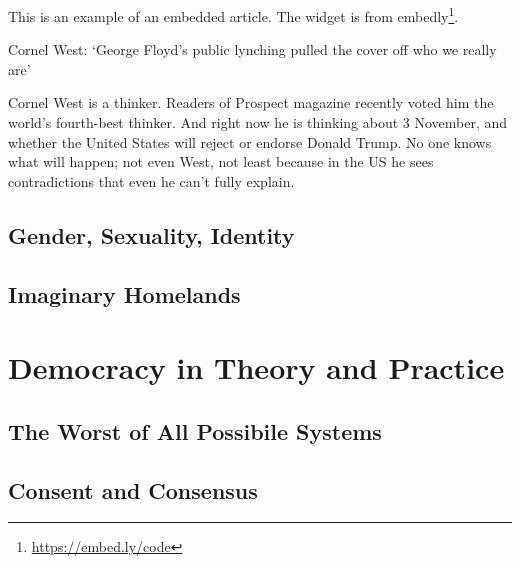 \documentclass[
  12pt, openany]{book}
\renewcommand{\href}[2]{#2\footnote{\url{#1}}}
\newenvironment{embed}{\begin{center}}{\end{center}}
\begin{document}
This is an example of an embedded article. The widget is from \href{https://embed.ly/code}{embedly}.

\begin{embed}

\begin{embed}

Cornel West: `George Floyd's public lynching pulled the cover off who we really are'

Cornel West is a thinker. Readers of Prospect magazine recently voted him the world's fourth-best thinker. And right now he is thinking about 3 November, and whether the United States will reject or endorse Donald Trump. No one knows what will happen; not even West, not least because in the US he sees contradictions that even he can't fully explain.

\end{embed}

\end{embed}

\hypertarget{gender-sexuality-identity}{%
\subsection{Gender, Sexuality, Identity}\label{gender-sexuality-identity}}

\hypertarget{imaginary-homelands}{%
\subsection{Imaginary Homelands}\label{imaginary-homelands}}

\hypertarget{democracy-in-theory-and-practice}{%
\section{Democracy in Theory and Practice}\label{democracy-in-theory-and-practice}}

\hypertarget{the-worst-of-all-possibile-systems}{%
\subsection{The Worst of All Possibile Systems}\label{the-worst-of-all-possibile-systems}}

\hypertarget{consent-and-consensus}{%
\subsection{Consent and Consensus}\label{consent-and-consensus}}
\end{document}
